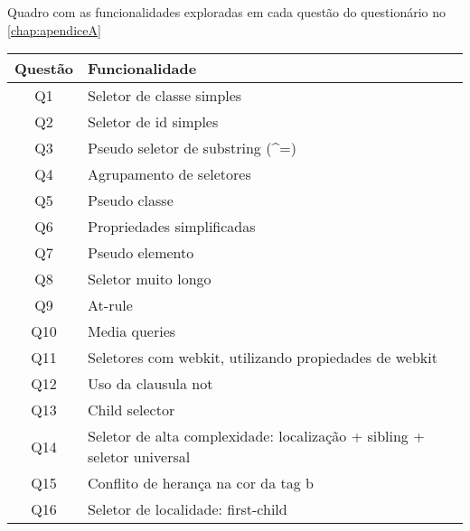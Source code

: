 \begin{quadro}[]
\centering
\caption{Quadro com as funcionalidades exploradas em cada questão do questionário no \autoref{chap:apendiceA}}
\label{quad:questionXfunc}
\begin{tabular}{|c|l|}
\hline
\textbf{Questão} & \textbf{Funcionalidade}                                                  \\ \hline
Q1               & Seletor de classe simples                                                \\ \hline
Q2               & Seletor de id simples                                                    \\ \hline
Q3               & Pseudo seletor de substring (\textasciicircum =)                         \\ \hline
Q4               & Agrupamento de seletores                                                 \\ \hline
Q5               & Pseudo classe                                                            \\ \hline
Q6               & Propriedades simplificadas                                               \\ \hline
Q7               & Pseudo elemento                                                          \\ \hline
Q8               & Seletor muito longo                                                      \\ \hline
Q9               & At-rule                                                                  \\ \hline
Q10              & Media queries                                                            \\ \hline
Q11              & Seletores com webkit, utilizando propiedades de webkit                   \\ \hline
Q12              & Uso da clausula not                                                      \\ \hline
Q13              & Child selector                                                           \\ \hline
Q14              & Seletor de alta complexidade: localização + sibling  + seletor universal \\ \hline
Q15              & Conflito de herança na cor da tag b                                      \\ \hline
Q16              & Seletor de localidade: first-child                                       \\ \hline
\end{tabular}
\end{quadro}